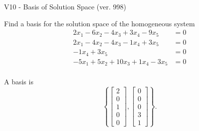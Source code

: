 \begin{exercise}
  \begin{exerciseTitle}V10 - Basis of Solution Space (ver. 998)\end{exerciseTitle}
  \begin{exerciseStatement}
    Find a basis for the solution space of the homogeneous system 
\begin{align*}
 2 x_ 1 -6 x_ 2 -4 x_ 3 + 3 x_ 4 -9 x_ 5 &= 0  \\ 
  2 x_ 1 -4 x_ 2 -4 x_ 3 -1 x_ 4 + 3 x_ 5 &= 0  \\ 
  -1 x_ 4 + 3 x_ 5 &= 0  \\ 
  -5 x_ 1 + 5 x_ 2 + 10 x_ 3 + 1 x_ 4 -3 x_ 5 &= 0  \\ 
 \end{align*}


 
  \end{exerciseStatement}

  \begin{exerciseAnswer}
   A basis is   
\[\left\{\left[\begin{array}{c}
2 \\
0 \\
1 \\
0 \\
0
\end{array}\right] , \left[\begin{array}{c}
0 \\
0 \\
0 \\
3 \\
1
\end{array}\right]\right\}.\]

  


  \end{exerciseAnswer}
\end{exercise}